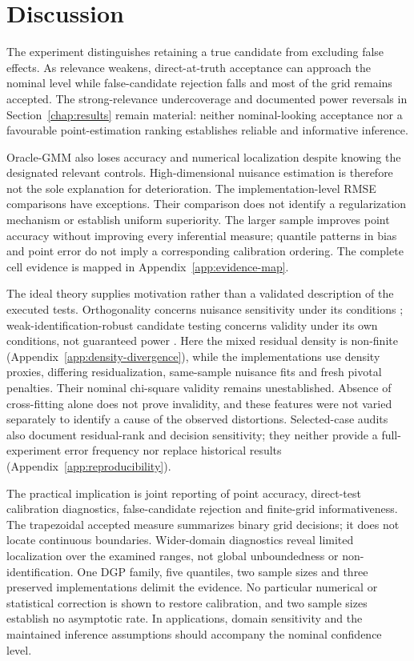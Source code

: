 \section{Discussion}
\label{sec:results-overall-interpretation}

The experiment distinguishes retaining a true candidate from excluding false effects. As relevance weakens, direct-at-truth acceptance can approach the nominal level while false-candidate rejection falls and most of the grid remains accepted. The strong-relevance undercoverage and documented power reversals in Section~\ref{chap:results} remain material: neither nominal-looking acceptance nor a favourable point-estimation ranking establishes reliable and informative inference.

Oracle-GMM also loses accuracy and numerical localization despite knowing the designated relevant controls. High-dimensional nuisance estimation is therefore not the sole explanation for deterioration. The implementation-level RMSE comparisons have exceptions. Their comparison does not identify a regularization mechanism or establish uniform superiority. The larger sample improves point accuracy without improving every inferential measure; quantile patterns in bias and point error do not imply a corresponding calibration ordering. The complete cell evidence is mapped in Appendix~\ref{app:evidence-map}.

The ideal theory supplies motivation rather than a validated description of the executed tests. Orthogonality concerns nuisance sensitivity under its conditions \parencite{chernozhukov_et_al_2018}; weak-identification-robust candidate testing concerns validity under its own conditions, not guaranteed power \parencite{chernozhukov_hansen_2008}. Here the mixed residual density is non-finite (Appendix~\ref{app:density-divergence}), while the implementations use density proxies, differing residualization, same-sample nuisance fits and fresh pivotal penalties. Their nominal chi-square validity remains unestablished. Absence of cross-fitting alone does not prove invalidity, and these features were not varied separately to identify a cause of the observed distortions. Selected-case audits also document residual-rank and decision sensitivity; they neither provide a full-experiment error frequency nor replace historical results (Appendix~\ref{app:reproducibility}).

The practical implication is joint reporting of point accuracy, direct-test calibration diagnostics, false-candidate rejection and finite-grid informativeness. The trapezoidal accepted measure summarizes binary grid decisions; it does not locate continuous boundaries. Wider-domain diagnostics reveal limited localization over the examined ranges, not global unboundedness or non-identification. One DGP family, five quantiles, two sample sizes and three preserved implementations delimit the evidence. No particular numerical or statistical correction is shown to restore calibration, and two sample sizes establish no asymptotic rate. In applications, domain sensitivity and the maintained inference assumptions should accompany the nominal confidence level.
